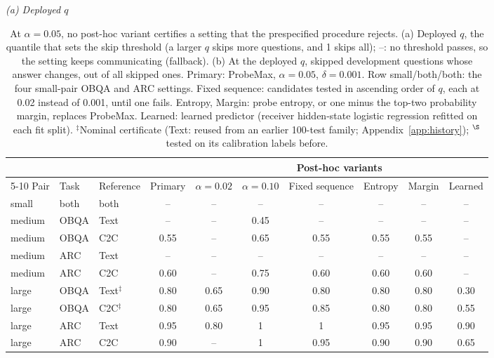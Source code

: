 \begin{table}[!htbp]\centering\scriptsize
\caption{At $\alpha=0.05$, no post-hoc variant certifies a setting that the prespecified procedure rejects. (a) Deployed $q$, the quantile that sets the skip threshold (a larger $q$ skips more questions, and 1 skips all); --: no threshold passes, so the setting keeps communicating (fallback). (b) At the deployed $q$, skipped development questions whose answer changes, out of all skipped ones. Primary: ProbeMax, $\alpha=0.05$, $\delta=0.001$. Row small/both/both: the four small-pair OBQA and ARC settings. Fixed sequence: candidates tested in ascending order of $q$, each at 0.02 instead of 0.001, until one fails. Entropy, Margin: probe entropy, or one minus the top-two probability margin, replaces ProbeMax. Learned: learned predictor (receiver hidden-state logistic regression refitted on each fit split). $^\ddagger$Nominal certificate (Text: reused from an earlier 100-test family; Appendix~\ref{app:history}); $^\S$tested on its calibration labels before.}
\label{tab:sensitivity}
\renewcommand{\arraystretch}{1.2}\setlength{\tabcolsep}{3pt}
\vspace{5pt}\textit{(a) Deployed $q$}\par\smallskip
\begin{tabular*}{\linewidth}{@{}lll@{\extracolsep{\fill}}ccccccc@{}}\toprule
& & & & \multicolumn{6}{c}{Post-hoc variants}\\\cmidrule(l){5-10}
Pair & Task & Reference & Primary & $\alpha=0.02$ & $\alpha=0.10$ & Fixed sequence & Entropy & Margin & Learned\\\midrule
small & both & both & -- & -- & -- & -- & -- & -- & --\\
\addlinespace[3pt]
medium & OBQA & Text & -- & -- & 0.45 & -- & -- & -- & --\\
medium & OBQA & C2C & 0.55 & -- & 0.65 & 0.55 & 0.55 & 0.55 & --\\
medium & ARC & Text & -- & -- & -- & -- & -- & -- & --\\
medium & ARC & C2C & 0.60 & -- & 0.75 & 0.60 & 0.60 & 0.60 & --\\
\addlinespace[3pt]
large & OBQA & Text$^\ddagger$ & 0.80 & 0.65 & 0.90 & 0.80 & 0.80\rlap{$^\S$} & 0.80 & 0.30\rlap{$^\S$}\\
large & OBQA & C2C$^\ddagger$ & 0.80 & 0.65 & 0.95 & 0.85 & 0.80 & 0.80 & 0.55\\
large & ARC & Text & 0.95 & 0.80 & 1 & 1 & 0.95 & 0.95 & 0.90\\
large & ARC & C2C & 0.90 & -- & 1 & 0.95 & 0.90 & 0.90 & 0.65\\

\end{tabular*}
\end{table}
